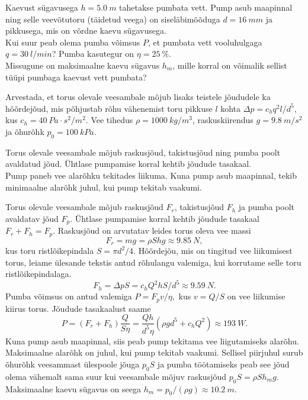 
Kaevust sügavusega $h=\SI{5.0}{m}$ tahetakse pumbata vett. Pump asub
maapinnal ning selle veevõtutoru (täidetud veega) on siseläbimõõduga
$d=\SI{16}{mm}$ ja pikkusega, mis on võrdne kaevu sügavusega.\\
\osa Kui suur peab olema pumba võimsus $P$, et pumbata vett vooluhulgaga
$q=\SI{30}{l/min}$? Pumba kasutegur on $\eta=\SI{25}{\percent}$.\\
\osa Missugune on maksimaalne kaevu sügavus $h_{m}$, mille korral on
võimalik sellist tüüpi pumbaga kaevust vett pumbata?

Arvestada, et torus olevale veesambale mõjub lisaks teistele jõududele
ka hõõrdejõud, mis põhjustab rõhu vähenemist toru pikkuse $l$ kohta $\Delta p=c_{h}q^{2}l/d^{5},$
kus $c_{h}=\SI{40}{Pa\cdot s^{2}/m^{2}}.$ Vee tihedus $\rho=\SI{1000}{kg/m^{3}}$,
raskuskiirendus $g=\SI{9.8}{m/s^{2}}$ ja õhurõhk $p_{0}=\SI{100}{kPa}.$

\hint
\osa Torus olevale veesambale mõjub raskusjõud, takistusjõud ning pumba poolt avaldatud jõud. Ühtlase pumpamise korral kehtib jõudude tasakaal.\\
\osa Pump paneb vee alarõhku tekitades liikuma. Kuna pump asub maapinnal, tekib minimaalne alarõhk juhul, kui pump tekitab vaakumi.

\solu
\osa Torus olevale veesambale mõjub raskusjõud $F_{r}$, takistusjõud $F_{h}$
ja pumba poolt avaldatav jõud $F_{p}$. Ühtlase pumpamise korral
kehtib jõudude tasakaal $F_{r}+F_{h}=F_{p}$. Raskusjõud on
arvutatav leides torus oleva vee massi
\[
F_{r}=mg=\rho Shg\approx\SI{9.85}{N},
\]
kus toru ristlõikepindala $S=\pi d^{2}/4.$ Hõõrdejõu, mis
on tingitud vee liikumisest torus, leiame ülesande tekstis antud rõhulangu
valemiga, kui korrutame selle toru ristlõikepindalaga.
\[
F_{h}=\Delta pS=c_{h}Q^{2}hS/d^{5}\approx\SI{9.59}{N}.
\]
Pumba võimsus on antud valemiga $P=F_{p}v/\eta,$ kus $v=Q/S$
on vee liikumise kiirus torus. Jõudude tasakaalust saame
\[
P=\left(F_{r}+F_{h}\right)\frac{Q}{S\eta}=\frac{Qh}{d^{5}\eta}\left(\rho gd^{5}+c_{h}Q^{2}\right)\approx\SI{193}{W}.
\]
\osa Kuna pump asub maapinnal, siis peab pump tekitama vee liigutamiseks
alarõhu. Maksimaalne alarõhk on juhul, kui pump tekitab vaakumi.
Sellisel piirjuhul surub õhurõhk veesammast ülespoole jõuga $p_{0}S$
ja pumba töötamiseks peab see jõud olema vähemalt sama suur kui veesambale
mõjuv raskusjõud $p_{0}S=\rho Sh_{m}g.$ Maksimaalne kaevu sügavus
on seega $h_{m}=p_{0}/\left(\rho g\right)\approx\SI{10.2}{m}$.

